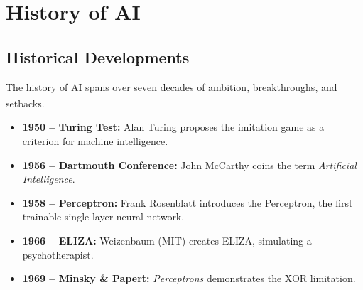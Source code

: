     \section{History of AI}
    \subsection{Historical Developments}

    \begin{tcbitemize}[ skin=sectionraster ]
        \tcbitem[title=Key Milestones in AI History, raster multicolumn=3]
        The history of AI spans over seven decades of ambition, breakthroughs, and setbacks\textsuperscript{\cite[][p.~6]{hurbansGrokkingArtificialIntelligence2020}}.
        \begin{itemize}
            \item \textbf{1950 -- Turing Test:} Alan Turing proposes the imitation game as a criterion for machine intelligence.
            \item \textbf{1956 -- Dartmouth Conference:} John McCarthy coins the term \emph{Artificial Intelligence}.
            \item \textbf{1958 -- Perceptron:} Frank Rosenblatt introduces the Perceptron, the first trainable single-layer neural network.
            \item \textbf{1966 -- ELIZA:} Weizenbaum (MIT) creates ELIZA, simulating a psychotherapist.
            \item \textbf{1969 -- Minsky \& Papert:} \emph{Perceptrons} demonstrates the XOR limitation.
        \end{itemize}


\end{tcbitemize}
